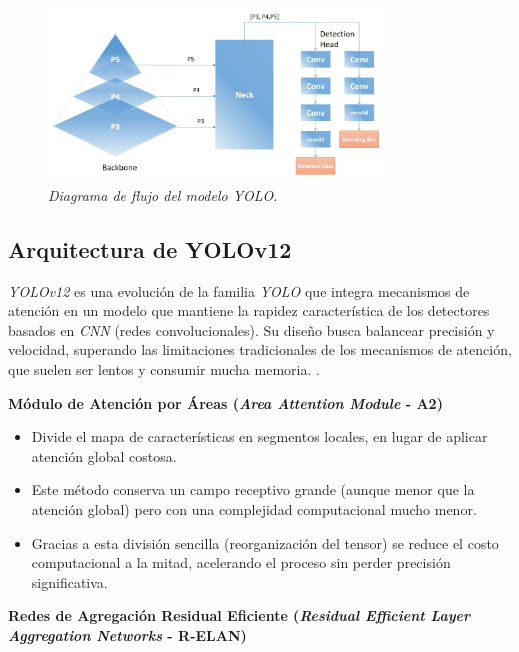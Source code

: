 {\begin{figure}[H]
\leavevmode
\begin{minipage}{\textwidth}
\begin{center}
\includegraphics[width=0.8\textwidth]{./capitulo_02/figures/yolo11}
\caption{\textit{Diagrama de flujo del modelo YOLO}. \label{fig:yolo11}}
\end{center}
\end{minipage}
\end{figure}

\subsection{Arquitectura de YOLOv12}

\textit{YOLOv12} es una evolución de la familia \textit{YOLO} que integra mecanismos de atención en un modelo que mantiene la rapidez característica de los detectores basados en \emph{CNN} (redes convolucionales). Su diseño busca balancear precisión y velocidad, superando las limitaciones tradicionales de los mecanismos de atención, que suelen ser lentos y consumir mucha memoria. \cite{learnopencv2025}.


\textbf{Módulo de Atención por Áreas (\emph{Area Attention Module} - A2)}

\begin{itemize}
    \item Divide el mapa de características en segmentos locales, en lugar de aplicar atención global costosa.
    \item Este método conserva un campo receptivo grande (aunque menor que la atención global) pero con una complejidad computacional mucho menor.
    \item Gracias a esta división sencilla (reorganización del tensor) se reduce el costo computacional a la mitad, acelerando el proceso sin perder precisión significativa.
\end{itemize}

\textbf{Redes de Agregación Residual Eficiente (\emph{Residual Efficient Layer Aggregation Networks} - R-ELAN)}

}
